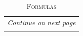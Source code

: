 \documentclass[addpoints, 12pt]{exam}%
\begin{document}
%

\setlength{\tabcolsep}{2pt}
\renewcommand{\arraystretch}{1.5}
\centering
	\begin{longtable}{ll}	
		\caption{\large \textsc{Formulas}} \\
		\endfirsthead
		 \multicolumn{2}{r}{{\textit{\footnotesize Continue on next page}}} \\
		\endfoot

		\endlastfoot
		
\end{longtable}		
		
\end{document}
